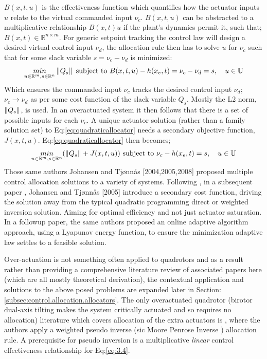 $B(x,t,u)$ is the effectiveness function which quantifies how the actuator inputs $u$ relate to the virtual commanded input $\nu_c$. $B(x,t,u)$ can be abstracted to a multiplicative relationship $B(x,t)u$ if the plant's dynamics permit it, such that; $B(x,t)\in\mathbb{R}^{n\times m}$. For generic setpoint tracking the control law will design a desired virtual control input $\nu_d$, the allocation rule then has to solve $u$ for $\nu_c$ such that for some slack variable $s=\nu_c-\nu_d$ is minimized:
\begin{equation}\label{eq:quadraticallocator}
\underset{u \in \mathbb{R}^m ,s \in \mathbb{R}^n}{min}\left\lVert Q_s\right\rVert ~\text{subject to} ~B(x,t,u) - h(x_e,t)=\nu_c-\nu_d=s,~~~u \in \mathbb{U}
\end{equation}
Which ensures the commanded input $\nu_c$ tracks the desired control input $\nu_d$; $\nu_c\rightarrow\nu_d$ as per some cost function of the slack variable $Q_s$. Mostly the L2 norm, $\left\lVert Q_s\right\rVert$, is used. In an overactuated system it then follows that there is a set of possible inputs for each $\nu_c$. A unique actuator solution (rather than a family solution set) to Eq:\ref{eq:quadraticallocator} needs a secondary objective function, $J(x,t,u)$. Eq:\ref{eq:quadraticallocator} then becomes;
\begin{equation} \label{eq:quadraticallocatorcost}
\underset{u \in \mathbb{R}^m ,s \in \mathbb{R}^n}{min}(\left\lVert Q_s\right\rVert+J(x,t,u)) ~\text{subject to} ~\nu_c - h(x_e,t)=s, ~~~u \in \mathbb{U}
\end{equation}
\newpage
Those same authors Johansen and Tjønnås [2004,2005,2008] proposed multiple control allocation solutions to a variety of systems. Following \cite{allocation}, in a subsequent paper \cite{efficientallocation}, Johansen and Tjønnås [2005] introduce a secondary cost function, driving the solution away from the typical quadratic programming direct or weighted inversion solution. Aiming for optimal efficiency and not just actuator saturation. In a followup paper\cite{adaptiveallocation}, the same authors proposed an online adaptive algorithm approach, using a Lyapunov energy function, to ensure the minimization adaptive law settles to a feasible solution.
\par
Over-actuation is not something often applied to quadrotors and as a result rather than providing a comprehensive literature review of associated papers here (which are all mostly theoretical derivation), the contextual application and solutions to the above posed problems are expanded later in Section:\ref{subsec:control.allocation.allocators}. The only overactuated quadrotor (birotor dual-axis tilting makes the system critically actuated and so requires no allocation) literature which covers allocation of the extra actuators is \cite{tiltgasco,tiltrihani}, where the authors apply a weighted pseudo inverse (sic Moore Penrose Inverse \cite{moorepenrose}) allocation rule. A prerequisite for pseudo inversion is a multiplicative \emph{linear} control effectiveness relationship for Eq:\ref{eq:3.4}. 
